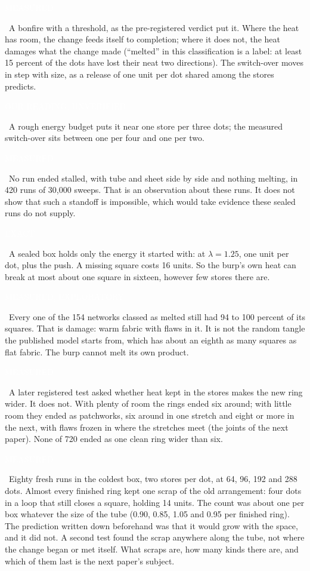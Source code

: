 \documentclass[11pt,letterpaper]{article}
\newcommand{\sub}[1]{\par\medskip{\color{ink}\large\bfseries #1}\par}
\newcommand{\tagbox}[2]{{\sffamily\scriptsize\colorbox{#1}{\textcolor{white}{\strut #2}}}}
\newcommand{\Exact}{\tagbox{kExact}{EXACT}}
\newcommand{\Meas}{\tagbox{kMeas}{MEASURED}}
\newcommand{\MeasX}{\tagbox{kMeas}{MEASURED, EXPLORATORY}}
\newcommand{\Ours}{\tagbox{kOurs}{OUR READING, UNVERIFIED}}
\begin{document}
\Meas\ A bonfire with a threshold, as the pre-registered verdict put it. Where the heat has room, the
change feeds itself to completion; where it does not, the heat damages what the change made
(``melted'' in this classification is a label: at least 15 percent of the dots have lost their neat two
directions). The switch-over moves in step with size, as a release of one unit per dot shared among the
stores predicts. \Ours\ A rough energy budget puts it near one store per three dots; the measured
switch-over sits between one per four and one per two.

\Meas\ No run ended stalled, with tube and sheet side by side and nothing melting, in 420 runs of
30,000 sweeps. That is an observation about these runs. It does not show that such a standoff is
impossible, which would take evidence these sealed runs do not supply.

\sub{What ``melted'' means here}
\Exact\ A sealed box holds only the energy it started with: at $\lambda=1.25$, one unit per dot,
plus the push. A missing square costs 16 units. So the burp's own heat can break at most about one
square in sixteen, however few stores there are. \MeasX\ Every one of the 154 networks classed as
melted still had 94 to 100 percent of its squares. That is damage: warm
fabric with flaws in it. It is not the random tangle the published model starts from, which has
about an eighth as many squares as flat fabric. The burp cannot melt its own product.

\Meas\ A later registered test asked whether heat kept in the stores makes the new ring wider. It
does not. With plenty of room the rings ended six around; with little room they ended as
patchworks, six around in one stretch and eight or more in the next, with flaws frozen in where the
stretches meet (the joints of the next paper). None of 720 ended as one clean ring wider than six.

\sub{What a cold box leaves}
\Meas\ Eighty fresh runs in the coldest box, two stores per dot, at 64, 96, 192 and 288 dots. Almost
every finished ring kept one scrap of the old arrangement: four dots in a loop that still closes a
square, holding 14 units. The count was about one per box whatever the size of the tube (0.90, 0.85,
1.05 and 0.95 per finished ring). The prediction written down beforehand was that it would grow with
the space, and it did not. A second test found the scrap anywhere along the tube, not where the change
began or met itself. What scraps are, how many kinds there are, and which of them last is the next
paper's subject.
\end{document}
